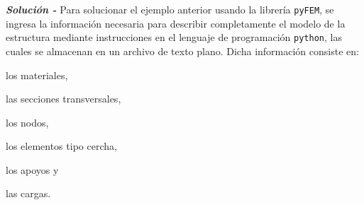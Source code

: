 \textit{\textbf{Solución -}} Para solucionar el ejemplo anterior usando la librería \texttt{pyFEM}, se ingresa la información necesaria para describir completamente el modelo de la estructura mediante instrucciones en el lenguaje de programación \texttt{python}, las cuales se almacenan en un archivo de texto plano. Dicha información consiste en:
\begin{inparaenum} [$ (1) $]
    \item los materiales,
    \item las secciones transversales,
    \item los nodos,
    \item los elementos tipo cercha,
    \item los apoyos y
    \item las cargas.
\end{inparaenum} \\


